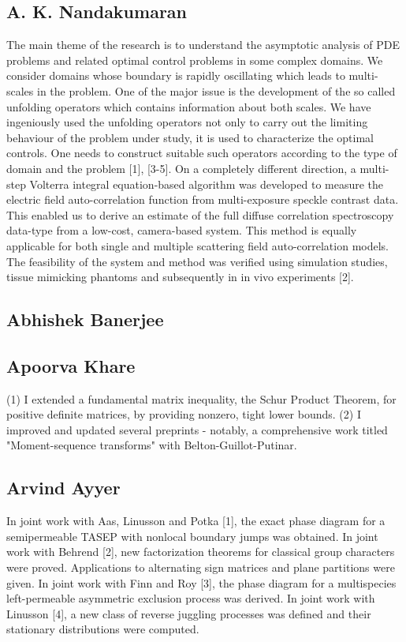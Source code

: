 \subsection{A. K. Nandakumaran}

The main theme of the research is to understand the asymptotic analysis of  PDE problems and related optimal control problems in some complex domains. We consider domains whose boundary is rapidly oscillating which  leads to multi-scales in the problem. One of the major issue is the development of the so called unfolding operators which contains information about both scales. We have ingeniously used the unfolding operators not only to carry out the limiting behaviour of the problem under study, it is used to characterize the optimal controls. One needs to construct suitable such operators according to the type of domain and the problem [1], [3-5]. On a completely different direction, a multi-step Volterra integral equation-based algorithm was developed to measure the electric field auto-correlation function from multi-exposure speckle contrast data. This enabled us to derive an estimate of the full diffuse correlation spectroscopy data-type from a low-cost, camera-based system. This method is equally applicable for both single and multiple scattering field auto-correlation models. The feasibility of the system and method was verified using simulation studies, tissue mimicking phantoms and subsequently in in vivo experiments [2].


\subsection{Abhishek Banerjee}




\subsection{Apoorva Khare}

(1) I extended a fundamental matrix inequality, the Schur Product Theorem, for positive definite matrices, by providing nonzero, tight lower bounds. (2) I improved and updated several preprints - notably, a comprehensive work titled "Moment-sequence transforms" with Belton-Guillot-Putinar.


\subsection{Arvind Ayyer}

In joint work with Aas, Linusson and Potka [1], the exact phase diagram for a semipermeable TASEP with nonlocal boundary jumps was obtained. In joint work with Behrend [2], new factorization theorems for classical group characters were proved. Applications to alternating sign matrices and plane partitions were given. In joint work with Finn and Roy [3], the phase diagram for a multispecies left-permeable asymmetric exclusion process was derived. In joint work with Linusson [4], a new class of reverse juggling processes was defined and their stationary distributions were computed.


